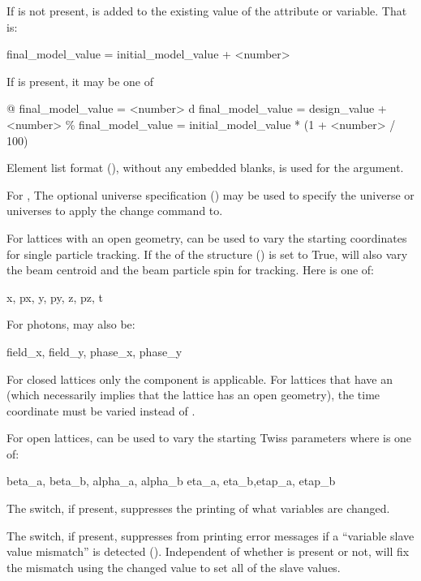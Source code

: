 If  is not present,  is added to the existing value
of the attribute or variable. That is:
\begin{example}
  final_model_value = initial_model_value + <number>
\end{example}
If  is present, it may be one of
\begin{example}
  @       final_model_value = <number>
  d       final_model_value = design_value + <number>
  \%       final_model_value = initial_model_value * (1 + <number> / 100)
\end{example}

Element list format (), without any embedded blanks, is used for
the  argument.

For , The optional  universe specification () may
be used to specify the universe or universes to apply the change command to.

For lattices with an open geometry,  can be used to
vary the starting coordinates for single particle tracking. If the  of the
 structure () is set to True,  will also vary the
beam centroid and the beam particle spin for tracking. Here  is one of:
\begin{example}
  x, px, y, py, z, pz, t
\end{example}
For photons,  may also be:
\begin{example}
  field_x, field_y, phase_x, phase_y
\end{example}
For closed lattices only the  component is applicable. For lattices that have an 
(which necessarily implies that the lattice has an open geometry), the time  coordinate must
be varied instead of .

For open lattices,  can be used to vary the starting Twiss
parameters where  is one of:
\begin{example}
  beta_a, beta_b, alpha_a, alpha_b 
  eta_a, eta_b,etap_a, etap_b    
\end{example}

The  switch, if present, suppresses the printing of what variables are changed.

The  switch, if present, suppresses \tao from printing error messages if a ``variable
slave value mismatch'' is detected (). Independent of whether  is
present or not, \tao will fix the mismatch using the changed value to set all of the slave values.

